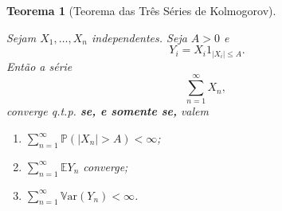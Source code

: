 \documentclass[12pt,a4paper,oneside]{book}
\newtheorem{theorem}{Teorema}[section]
\theoremstyle{definition}
\theoremstyle{remark}
\numberwithin{equation}{section}
\newcommand{\E}{\mathbb{E}}
\newcommand{\pr}{\mathbb{P}}
\newcommand{\ds}{\displaystyle}
\newcommand{\Var}{\mathbb{V}\text{ar}}
\begin{document}
\begin{tcolorbox}


\begin{theorem}[Teorema das Três Séries de Kolmogorov] \label{teo-3series} 

Sejam $X_1,\dots,X_n$ independentes. Seja $A>0$ e 
$$Y_i = X_i1_{|X_i|\leq A}.$$ Então a série
$$\sum_{n=1}^\infty X_n,\  $$
converge q.t.p. \textbf{se, e somente se,} valem
\begin{enumerate}
\item $\ds\sum_{n=1}^\infty\pr(|X_n|>A)<\infty$;
\item $\ds\sum_{n=1}^\infty \E Y_n$ converge;
\item $\ds\sum_{n=1}^\infty \Var (Y_n)<\infty$.
\end{enumerate} 
\end{theorem}
\end{tcolorbox}
\end{document}
